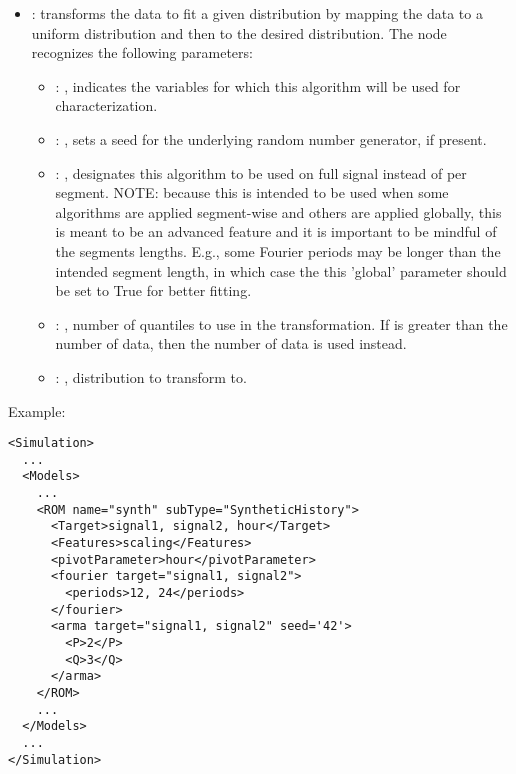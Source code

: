 \begin{itemize}
    \item {}:
      transforms the data to fit a given distribution by mapping the data to     a uniform
      distribution and then to the desired distribution.
      The  node recognizes the following parameters:
        \begin{itemize}
          \item {}: , 
            indicates the variables for which this algorithm will be used for characterization.
          \item {}: , 
            sets a seed for the underlying random number generator, if present.
          \item {}: , 
            designates this algorithm to be used on full signal instead of per
            segment. NOTE: because this is intended to be used when some algorithms are
            applied segment-wise and others are applied globally, this is meant to be an
            advanced feature and it is important to be mindful of the segments lengths.
            E.g., some Fourier periods may be longer than the intended segment length, in
            which case the this 'global' parameter should be set to True for better
            fitting. 
          \item {}: , 
            number of quantiles to use in the transformation. If 
            is greater than the number of data, then the number of data is used instead. 
          \item {}: , 
            distribution to transform to. 
      \end{itemize}
  \end{itemize}

\hspace{24pt}
Example:
\begin{lstlisting}[style=XML,morekeywords={name,subType,pivotLength,shift,target,threshold,period,width}]
<Simulation>
  ...
  <Models>
    ...
    <ROM name="synth" subType="SyntheticHistory">
      <Target>signal1, signal2, hour</Target>
      <Features>scaling</Features>
      <pivotParameter>hour</pivotParameter>
      <fourier target="signal1, signal2">
        <periods>12, 24</periods>
      </fourier>
      <arma target="signal1, signal2" seed='42'>
        <P>2</P>
        <Q>3</Q>
      </arma>
    </ROM>
    ...
  </Models>
  ...
</Simulation>
\end{lstlisting}


